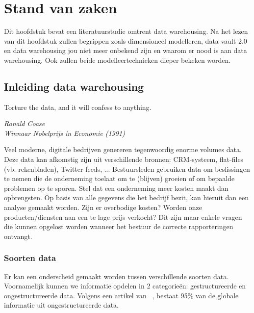 \chapter{Stand van zaken}
\label{ch:stand-van-zaken}



Dit hoofdstuk bevat een literatuurstudie omtrent data warehousing. Na het lezen van dit hoofdstuk zullen begrippen zoals dimensioneel modelleren, data vault 2.0 en data warehousing jou niet meer onbekend zijn en waarom er nood is aan data warehousing. Ook zullen beide modelleertechnieken dieper bekeken worden.

\section{Inleiding data warehousing}

\epigraph{Torture the data, and it will confess to anything. }{\textit{Ronald Coase \\ Winnaar Nobelprijs in Economie (1991)}}

Veel moderne, digitale bedrijven genereren tegenwoordig enorme volumes data. Deze data kan afkomstig zijn uit verschillende bronnen: CRM-systeem, flat-files (vb. rekenbladen), Twitter-feeds, ... Bestuursleden gebruiken data om beslissingen te nemen die de onderneming toelaat om te (blijven) groeien of om bepaalde problemen op te sporen. Stel dat een onderneming meer kosten maakt dan opbrengsten. Op basis van alle gegevens die het bedrijf bezit, kan hieruit dan een analyse gemaakt worden. Zijn er overbodige kosten? Worden onze producten/diensten aan een te lage prijs verkocht? Dit zijn maar enkele vragen die kunnen opgelost worden wanneer het bestuur de correcte rapporteringen ontvangt. 

\subsection{Soorten data}
Er kan een onderscheid gemaakt worden tussen verschillende soorten data. Voornamelijk kunnen we informatie opdelen in 2 categorieën: gestructureerde en ongestructureerde data. Volgens een artikel van ~\textcite{Langseth2005}, bestaat 95\% van de globale informatie uit ongestructureerde data. 

